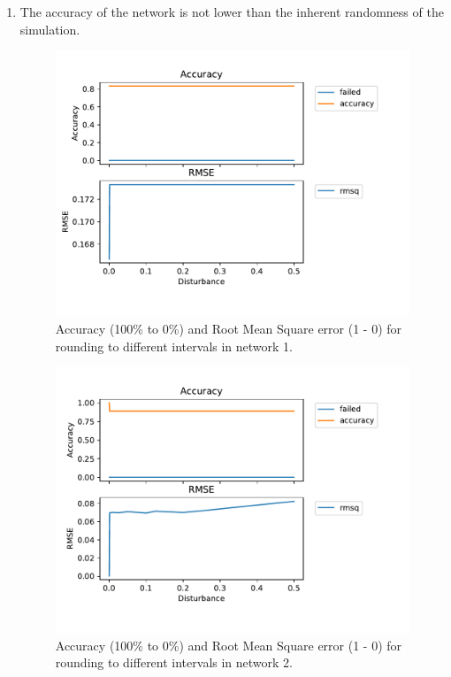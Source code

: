 \begin{enumerate}
\item The accuracy of the network is not lower than the inherent randomness of the simulation.



\begin{figure}[htbp]
\begin{center}
\includegraphics[]{../experiments/VlekNetwork/plots/performance_KB1.pdf}
\caption{Accuracy (100\% to 0\%) and Root Mean Square error (1 - 0) for rounding to different intervals in network 1.}
\label{kb1a}
\end{center}
\end{figure}

\begin{figure}[htbp]
\begin{center}
\includegraphics[]{../experiments/VlekNetwork/plots/performance_KB2.pdf}
\caption{Accuracy (100\% to 0\%) and Root Mean Square error (1 - 0) for rounding to different intervals in network 2.}
\label{kb2a}
\end{center}
\end{figure}


\end{enumerate}
